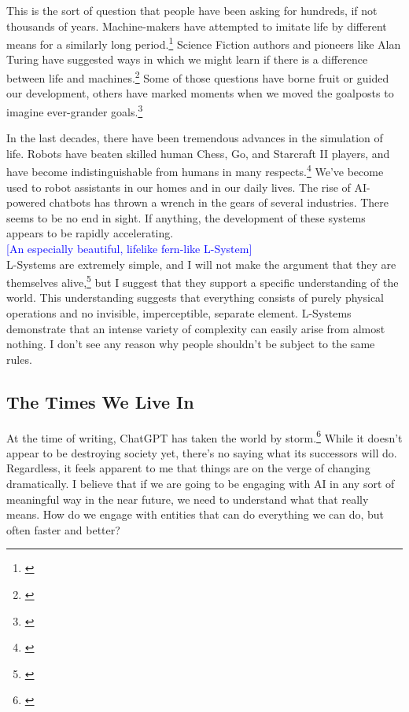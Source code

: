 \documentclass[12pt,twoside]{reedthesis}
\begin{document}
	This is the sort of question that people have been asking for hundreds, if not thousands of years. Machine-makers have attempted to imitate life by different means for a similarly long period.\footnote{\cite{riskin2016}} Science Fiction authors and pioneers like Alan Turing have suggested ways in which we might learn if there is a difference between life and machines.\footnote{\cite{turing1936}} Some of those questions have borne fruit or guided our development, others have marked moments when we moved the goalposts to imagine ever-grander goals.\footnote{\cite{theory2004}}
	
	In the last decades, there have been tremendous advances in the simulation of life. Robots have beaten skilled human Chess, Go, and Starcraft II players, and have become indistinguishable from humans in many respects.\footnote{\cite{gamerAI2019}} We've become used to robot assistants in our homes and in our daily lives. The rise of AI-powered chatbots has thrown a wrench in the gears of several industries. There seems to be no end in sight. If anything, the development of these systems appears to be rapidly accelerating.\\
	
	\textcolor{blue}{[An especially beautiful, lifelike fern-like L-System]}\\
	
	L-Systems are extremely simple, and I will not make the argument that they are themselves alive,\footnote{\cite{theory2004}} but I suggest that they support a specific understanding of the world. This understanding suggests that everything consists of purely physical operations and no invisible, imperceptible, separate element. L-Systems demonstrate that an intense variety of complexity can easily arise from almost nothing. I don't see any reason why people shouldn't be subject to the same rules.

\subsection{The Times We Live In} %
\label{AI-Art}

	At the time of writing, ChatGPT has taken the world by storm.\footnote{\cite{ChatGPT}} While it doesn't appear to be destroying society yet, there's no saying what its successors will do. Regardless, it feels apparent to me that things are on the verge of changing dramatically. I believe that if we are going to be engaging with AI in any sort of meaningful way in the near future, we need to understand what that really means. How do we engage with entities that can do everything we can do, but often faster and better?
	
\end{document}
